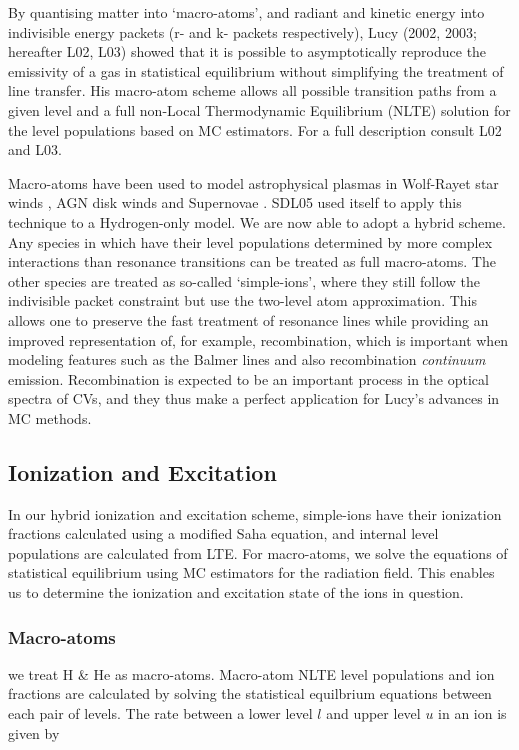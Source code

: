 \documentclass[preprint, a4paper, 11pt]{aastex}
\begin{document}
By quantising matter into `macro-atoms', and radiant and kinetic 
energy into indivisible energy packets (r- and k- packets respectively), 
Lucy (2002, 2003\nocite{lucy2002, lucy2003}; hereafter L02, L03) showed that it is possible 
to asymptotically reproduce the emissivity of a gas in statistical equilibrium 
without simplifying the treatment of line transfer. 
His macro-atom scheme allows all possible transition paths from a given level and a full non-Local 
Thermodynamic Equilibrium (NLTE) solution for the level populations based on MC estimators. 
For a full description consult L02 and L03. 

Macro-atoms have been used to model astrophysical plasmas in 
Wolf-Rayet star winds \citep{sim2004}, AGN disk winds \citep{simlong2008, tatum2012}
and Supernovae \citep{kasen2006, kerzendorfsim}.
SDL05 used \py itself to apply this technique to
a Hydrogen-only model. We are now able to adopt a hybrid scheme. 
Any species in which have their level populations determined by
more complex interactions than resonance transitions
can be treated as full macro-atoms. The other species are treated as so-called `simple-ions',
where they still follow the indivisible packet constraint but use the two-level atom approximation.
This allows one to preserve the fast treatment of resonance lines while providing 
an improved representation of, for example, recombination, which is important when modeling features 
such as the Balmer lines and also recombination {\sl continuum} emission. 
Recombination is expected to be an important process in the optical
spectra of CVs, and they thus make a perfect application for Lucy's 
advances in MC methods.


\subsection{Ionization and Excitation}

In our hybrid ionization and excitation scheme, 
simple-ions have their ionization fractions
calculated using a modified Saha equation, and internal level populations are
calculated from LTE. For macro-atoms, we solve the equations of statistical 
equilibrium using MC estimators for the radiation field. This enables us to 
determine the ionization and excitation state of the ions in question.

\subsubsection{Macro-atoms}
we treat H \& He as macro-atoms. 
Macro-atom NLTE level populations and ion fractions are calculated by solving 
the statistical equilbrium equations between each pair of levels. The rate
between a lower level $l$ and upper level $u$ in an ion is given by
\end{document}
